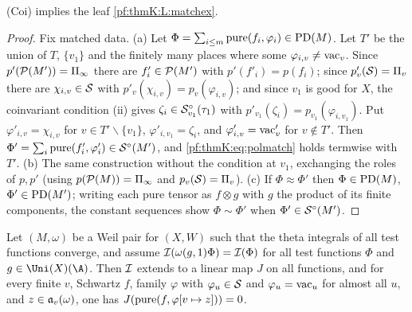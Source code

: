 \begin{proposition}[Partners]\label{pf:thmK:matchex}
\textup{(Coi)} implies the leaf \ref{pf:thmK:L:matchex}.
\end{proposition}

\begin{proof}
Fix matched data. (a) Let $\Phi=\sum_{i\le m}\operatorname{pure}(f_i,\varphi_i)\in\operatorname{PD}(M)$. Let $T'$ be the union of $T$, $\{v_1\}$
and the finitely many places where some $\varphi_{i,v}\ne\mathrm{vac}_v$. Since $p'(\mathcal{P}(M'))=\Pi_\infty$ there are
$f'_i\in\mathcal{P}(M')$ with $p'(f'_i)=p(f_i)$; since $p'_v(\mathcal{S})=\Pi_v$ there are $\chi_{i,v}\in\mathcal{S}$ with
$p'_v(\chi_{i,v})=p_v(\varphi_{i,v})$; and since $v_1$ is good for $X$, the coinvariant condition (ii) gives
$\zeta_i\in\mathcal{S}^{\circ}_{v_1}(\tau_1)$ with $p'_{v_1}(\zeta_i)=p_{v_1}(\varphi_{i,v_1})$. Put $\varphi'_{i,v}=\chi_{i,v}$ for
$v\in T'\smallsetminus\{v_1\}$, $\varphi'_{i,v_1}=\zeta_i$, and $\varphi'_{i,v}=\mathrm{vac}'_v$ for $v\notin T'$. Then
$\Phi'=\sum_i\operatorname{pure}(f'_i,\varphi'_i)\in\mathcal{S}^{\circ}(M')$, and \eqref{pf:thmK:eq:polmatch} holds termwise with $T'$.
(b) The same construction without the condition at $v_1$, exchanging the roles of $p,p'$ (using $p(\mathcal{P}(M))=\Pi_\infty$
and $p_v(\mathcal{S})=\Pi_v$). (c) If $\Phi\approx\Phi'$ then $\Phi\in\operatorname{PD}(M)$, $\Phi'\in\operatorname{PD}(M')$; writing each pure tensor
as $f\otimes g$ with $g$ the product of its finite components, the constant sequences show $\Phi\sim\Phi'$ when
$\Phi'\in\mathcal{S}^{\circ}(M')$.
\end{proof}

\begin{lemma}\label{pf:thmK:killaug}
Let $(M,\omega)$ be a Weil pair for $(X,W)$ such that the theta integrals of all test functions converge, and assume
$\mathcal{I}(\omega(g,1)\Phi)=\mathcal{I}(\Phi)$ for all test functions $\Phi$ and $g\in\Uni(X)(\A)$. Then $\mathcal{I}$ extends to a linear
map $J$ on all functions, and for every finite $v$, Schwartz $f$, family $\varphi$ with $\varphi_u\in\mathcal{S}$ and
$\varphi_u=\mathrm{vac}_u$ for almost all $u$, and $z\in\mathfrak{a}_v(\omega)$, one has $J(\operatorname{pure}(f,\varphi[v\mapsto z]))=0$.
\end{lemma}

